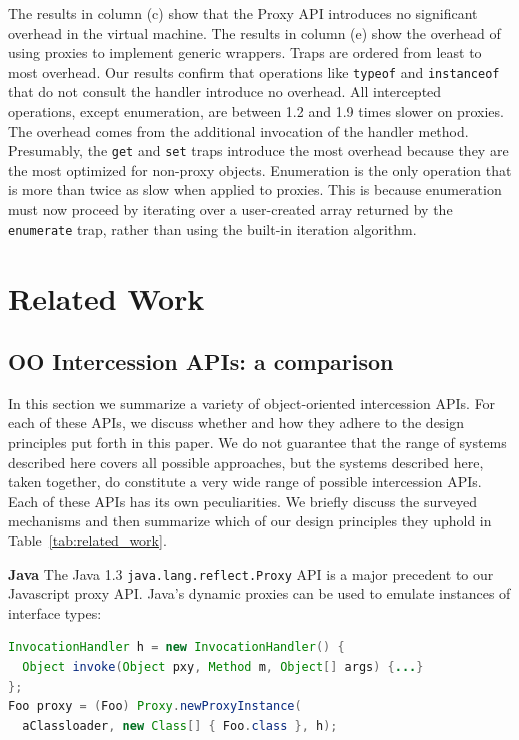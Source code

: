 \documentclass{acm_proc_article-sp}
\begin{document}
The results in column (c) show that the Proxy API introduces no significant overhead in the virtual machine. The results in column (e) show the overhead of using proxies to implement generic wrappers. Traps are ordered from least to most overhead. Our results confirm that operations like \texttt{typeof} and \texttt{instanceof} that do not consult the handler introduce no overhead. All intercepted operations, except enumeration, are between 1.2 and 1.9 times slower on proxies. The overhead comes from the additional invocation of the handler method. Presumably, the \texttt{get} and \texttt{set} traps introduce the most overhead because they are the most optimized for non-proxy objects. Enumeration is the only operation that is more than twice as slow when applied to proxies. This is because enumeration must now proceed by iterating over a user-created array returned by the \texttt{enumerate} trap, rather than using the built-in iteration algorithm.

\section{Related Work}

\subsection{OO Intercession APIs: a comparison}
\label{sub:survey}

In this section we summarize a variety of object-oriented intercession APIs. For each of these APIs, we discuss whether and how they adhere to the design principles put forth in this paper. We do not guarantee that the range of systems described here covers all possible approaches, but the systems described here, taken together, do constitute a very wide range of possible intercession APIs. Each of these APIs has its own peculiarities. We briefly discuss the surveyed mechanisms and then summarize which of our design principles they uphold in Table~\ref{tab:related_work}.

\textbf{Java} The Java 1.3 \texttt{java.lang.reflect.Proxy} API is a major precedent to our Javascript proxy API. Java's dynamic proxies can be used to emulate instances of interface types:

\begin{lstlisting}[language=java]
InvocationHandler h = new InvocationHandler() {
  Object invoke(Object pxy, Method m, Object[] args) {...}
};
Foo proxy = (Foo) Proxy.newProxyInstance(
  aClassloader, new Class[] { Foo.class }, h);
\end{lstlisting}
\end{document}
